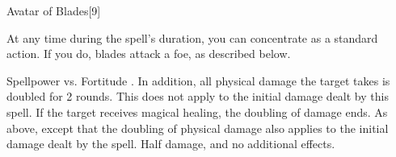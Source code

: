 \begin{spellsection}{Avatar of Blades}[9]
    \begin{spellheader}
    \end{spellheader}
    \begin{spellcontent}
        \begin{spelltargetinginfo}
        \end{spelltargetinginfo}
        \begin{spelleffects}
            \spelleffect At any time during the spell's duration, you can concentrate as a standard action. If you do, blades attack a foe, as described below.
            \spelldur \durlong
        \end{spelleffects}
    \end{spellcontent}
    \begin{spellsubcontent}
        \begin{spelltargetinginfo}
        \end{spelltargetinginfo}
        \begin{spelleffects}
            \begin{spellattack}{Spellpower vs. Fortitude}
                \spellsuccess {}. In addition, all physical damage the target takes is doubled for 2 rounds.
                This does not apply to the initial damage dealt by this spell.
                If the target receives magical healing, the doubling of damage ends.
                \spellcritical As above, except that the doubling of physical damage also applies to the initial damage dealt by the spell.
                \spellfailure Half damage, and no additional effects.
            \end{spellattack}
        \end{spelleffects}
    \end{spellsubcontent}
    \begin{spellfooter}
        \miscastexplode
    \end{spellfooter}
\end{spellsection}


